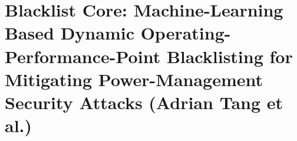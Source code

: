 \section{Blacklist Core: Machine-Learning Based Dynamic Operating-Performance-Point Blacklisting for Mitigating Power-Management Security Attacks (Adrian Tang et al.)}
